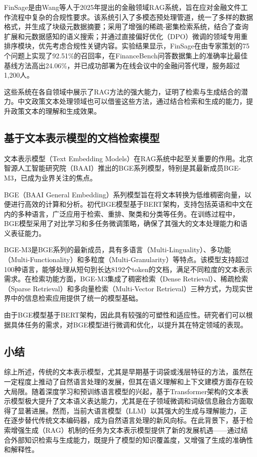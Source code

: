 \documentclass[12pt, a4paper]{ctexart}
\begin{document}
FinSage是由Wang等人于2025年提出的金融领域RAG系统，旨在应对金融文件工作流程中复杂的合规性要求\cite{wang2025finsagemultiaspectragfinancial}。该系统引入了多模态预处理管道，统一了多样的数据格式，并生成了块级元数据摘要；采用了增强的稀疏-密集检索系统，结合了查询扩展和元数据感知的语义搜索；并通过直接偏好优化（DPO）微调的领域专用重排序模块，优先考虑合规性关键内容。实验结果显示，FinSage在由专家策划的75个问题上实现了92.51\%的召回率，在FinanceBench问答数据集上的准确率比最佳基线方法高出24.06\%，并已成功部署为在线会议中的金融问答代理，服务超过1,200人。

这些系统在各自领域中展示了RAG方法的强大能力，证明了检索与生成结合的潜力。中文政策文本处理领域也可以借鉴这些方法，通过结合检索和生成的能力，提升政策文本的理解和生成效果。

\subsection{基于文本表示模型的文档检索模型}

文本表示模型（Text Embedding Models）在RAG系统中起至关重要的作用。北京智源人工智能研究院（BAAI）推出的BGE系列模型，特别是其最新成员BGE-M3，已成为业界关注的焦点。

BGE（BAAI General Embedding）系列模型旨在将文本转换为低维稠密向量，以便进行高效的计算和分析\cite{bge_embedding}。初代BGE模型基于BERT架构，支持包括英语和中文在内的多种语言，广泛应用于检索、重排、聚类和分类等任务。在训练过程中，BGE模型采用了对比学习和多任务微调策略，确保了其强大的文本处理能力和语义表征能力。

BGE-M3是BGE系列的最新成员，具有多语言（Multi-Linguality）、多功能（Multi-Functionality）和多粒度（Multi-Granularity）等特点\cite{chen2024bgem3embeddingmultilingualmultifunctionality}。该模型支持超过100种语言，能够处理从短句到长达8192个token的文档，满足不同粒度的文本表示需求。在检索功能方面，BGE-M3集成了稠密检索（Dense Retrieval）、稀疏检索（Sparse Retrieval）和多向量检索（Multi-Vector Retrieval）三种方式，为现实世界中的信息检索应用提供了统一的模型基础。

由于BGE模型基于BERT架构，因此具有较强的可塑性和适应性。研究者们可以根据具体任务的需求，对BGE模型进行微调和优化，以提升其在特定领域的表现。

\subsection{小结}

综上所述，传统的文本表示模型，尤其是早期基于词袋或浅层特征的方法，虽然在一定程度上推动了自然语言处理的发展，但其在语义理解和上下文建模方面存在较大局限。随着深度学习和预训练语言模型的兴起，基于Transformer架构的文本表示模型极大提升了文本语义表达能力，尤其是在子领域微调和词级信息融合方面取得了显著进展。然而，当前大语言模型（LLM）以其强大的生成与理解能力，正在逐步替代传统文本编码器，成为自然语言处理的新风向标。在此背景下，基于检索增强生成（RAG）机制的任务为文本表示模型提供了新的发展机遇——通过结合外部知识检索与生成能力，既提升了模型的知识覆盖度，又增强了生成的准确性和解释性。
\end{document}

